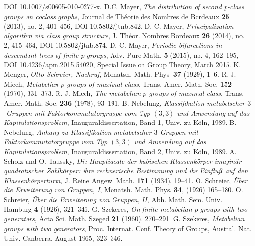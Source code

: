 \documentclass{amsart}
\theoremstyle{definition}
\numberwithin{equation}{section}
\begin{document}
\begin{thebibliography}{XX}
DOI 10.1007/s00605-010-0277-x.
D.C. Mayer, 
\textit{The distribution of second \(p\)-class groups on coclass graphs},
Journal de Th\'eorie des Nombres de Bordeaux
\textbf{25}
(2013),
no. 2,
401--456,
DOI 10.5802/jtnb.842. 
D. C. Mayer,
\textit{Principalization algorithm via class group structure},
J. Th\'eor. Nombres Bordeaux
\textbf{26}
(2014),
no. 2,
415--464,
DOI 10.5802/jtnb.874.
D. C. Mayer,
\textit{Periodic bifurcations in descendant trees of finite \(p\)-groups},
Adv. Pure Math.
\textbf{5}
(2015),
no. 4,
162--195,
DOI 10.4236/apm.2015.54020,
Special Issue on Group Theory,
March 2015.
K. Menger,
\textit{Otto Schreier, Nachruf},
Monatsh. Math. Phys.
\textbf{37}
(1929),
1--6.
R. J. Miech,
\textit{Metabelian \(p\)-groups of maximal class},
Trans. Amer. Math. Soc.
\textbf{152}
(1970),
331--373.
R. J. Miech,
\textit{The metabelian \(p\)-groups of maximal class},
Trans. Amer. Math. Soc.
\textbf{236}
(1978),
93--191.
B. Nebelung,
\textit{Klassifikation metabelscher \(3\)-Gruppen
mit Faktorkommutatorgruppe vom Typ \((3,3)\)
und Anwendung auf das Kapitulationsproblem},
Inauguraldissertation, Band 1,
Univ. zu K\"oln,
1989.
B. Nebelung,
\textit{Anhang zu
Klassifikation metabelscher \(3\)-Gruppen
mit Faktorkommutatorgruppe vom Typ \((3,3)\)
und Anwendung auf das Kapitulationsproblem},
Inauguraldissertation, Band 2,
Univ. zu K\"oln,
1989.
A. Scholz und O. Taussky,
\textit{Die Hauptideale der kubischen Klassenk\"orper
imagin\"ar quadratischer Zahlk\"orper:
ihre rechnerische Bestimmung
und ihr Einflu\ss\ auf den Klassenk\"orperturm},
J. Reine Angew. Math.
\textbf{171}
(1934),
19--41.
O. Schreier,
\textit{\"Uber die Erweiterung von Gruppen, I},
Monatsh. Math. Phys.
\textbf{34},
(1926)
165--180.
O. Schreier,
\textit{\"Uber die Erweiterung von Gruppen, II},
Abh. Math. Sem. Univ. Hamburg
\textbf{4}
(1926),
321--346.
G. Szekeres,
\textit{On finite metabelian \(p\)-groups with two generators},
Acta Sci. Math. Szeged
\textbf{21}
(1960),
270--291.
G. Szekeres,
\textit{Metabelian groups with two generators},
Proc. Internat. Conf. Theory of Groups,
Austral. Nat. Univ. Canberra,
August 1965,
323--346.
\end{thebibliography}
\end{document}
